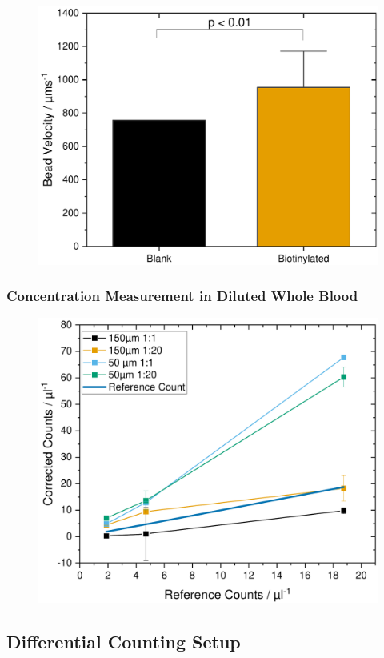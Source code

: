 \begin{figure}[htb!]
	\centering
	\includegraphics[width=.7\linewidth]{Ressources/Concentration/CaptureVelocity}
	\label{fig:conc:vel}
\end{figure}




\subsubsection{Concentration Measurement in Diluted Whole Blood}


\begin{figure}[htb!]
	\centering
	\includegraphics[width=.7\linewidth]{Ressources/Concentration/CorrectionBlood}
	\label{fig:conc:blood}
\end{figure}




\subsection{Differential Counting Setup}

